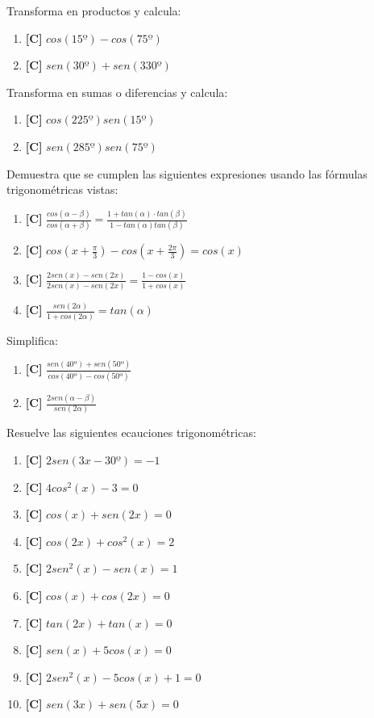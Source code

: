 \Exercicio Transforma en productos y calcula:

\begin{enumerate}[topsep=0pt]
	\item \textbf{[C]} $cos(15º) - cos(75º)$
	\item \textbf{[C]} $sen(30º) + sen(330º)$
\end{enumerate}


\Exercicio Transforma en sumas o diferencias y calcula:

\begin{enumerate}[topsep=0pt]
	\item \textbf{[C]} $cos(225º)sen(15º)$
	\item \textbf{[C]} $sen(285º)sen(75º)$
\end{enumerate}


\Exercicio Demuestra que se cumplen las siguientes expresiones usando las fórmulas trigonométricas vistas:

\begin{enumerate}[topsep=0pt]
	\item \textbf{[C]} $ \frac{cos(\alpha - \beta)}{cos(\alpha + \beta)} = \frac{1 + tan(\alpha) \cdot tan(\beta)}{1-tan(\alpha)tan(\beta)} $
	\item \textbf{[C]} $ cos(x + \frac{\pi}{3}) - cos(x + \frac{2\pi}{3}) = cos(x)$
	\item \textbf{[C]} $ \frac{2 sen(x) - sen(2x)}{2 sen(x) - sen(2x)} = \frac{1 - cos(x)}{1 + cos(x)}$
	\item \textbf{[C]} $ \frac{sen(2\alpha)}{1 + cos(2\alpha)} = tan(\alpha)$
\end{enumerate}


\Exercicio Simplifica:

\begin{enumerate}[topsep=0pt]
	\item \textbf{[C]} $\frac{sen(40º) + sen(50º)}{cos(40º) - cos(50º)}$
	\item \textbf{[C]} $\frac{2sen(\alpha - \beta)}{sen(2\alpha)}$
\end{enumerate}


\Exercicio Resuelve las siguientes ecauciones trigonométricas:

\begin{enumerate}[topsep=0pt]
	\item \textbf{[C]} $ 2sen(3x-30º) = -1 $
	\item \textbf{[C]} $ 4 cos^2(x) -3 = 0$
	\item \textbf{[C]} $ cos(x) + sen(2x) = 0$
	\item \textbf{[C]} $ cos(2x) + cos^2(x) = 2$
	\item \textbf{[C]} $ 2 sen^2(x) - sen(x) = 1$
	\item \textbf{[C]} $ cos(x) + cos(2x) = 0$
	\item \textbf{[C]} $ tan(2x) + tan(x) = 0$
	\item \textbf{[C]} $ sen(x) + 5cos(x) = 0 $
	\item \textbf{[C]} $ 2 sen^2(x) - 5 cos(x) + 1 = 0 $
	\item \textbf{[C]} $ sen(3x) + sen(5x) = 0 $
\end{enumerate}


